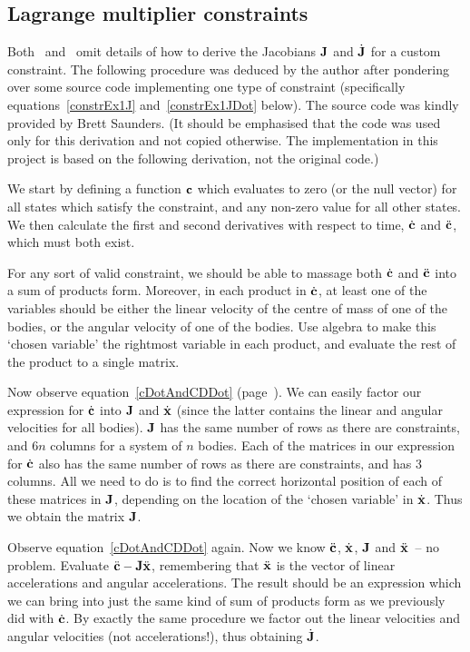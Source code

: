 \subsection{Lagrange multiplier constraints}

Both~\cite{BaraffWitkin:97} and~\cite{Saunders:PhD} omit details of how to derive the Jacobians
$\m{J}$ and $\dot{\m{J}}$ for a custom constraint. The following procedure was deduced
by the author after pondering over some source code implementing one type of constraint
(specifically equations~\ref{constrEx1J} and~\ref{constrEx1JDot} below). The source code
was kindly provided by Brett Saunders. (It should be emphasised that the code was used only
for this derivation and not copied otherwise. The implementation in this project is based
on the following derivation, not the original code.)

We start by defining a function $\ve{c}$ which evaluates to zero (or the null vector) for
all states which satisfy the constraint, and any non-zero value for all other states. 
We then calculate the first and second derivatives with respect to time, $\dot{\ve{c}}$
and $\ddot{\ve{c}}$, which must both exist.

For any sort of valid constraint, we should be able to massage both $\dot{\ve{c}}$ and
$\ddot{\ve{c}}$ into a sum of products form. Moreover, in each product in
$\dot{\ve{c}}$, at least one of the variables should be either the linear velocity of
the centre of mass of one of the bodies, or the angular velocity of one of the bodies.
Use algebra to make this `chosen variable' the rightmost variable in each product, and
evaluate the rest of the product to a single matrix.

Now observe equation~\ref{cDotAndCDDot} (page~\pageref{cDotAndCDDot}). We can easily
factor our expression for
$\dot{\ve{c}}$ into $\m{J}$ and $\dot{\ve{x}}$ (since the latter contains
the linear and angular velocities for all bodies). $\m{J}$ has the same number of rows
as there are constraints, and $6n$ columns for a system of $n$ bodies. Each of the matrices
in our expression for $\dot{\ve{c}}$ also has the same number of rows as there are
constraints, and has 3 columns. All we need to do is to find the correct horizontal position
of each of these matrices in $\m{J}$, depending on the location of the `chosen variable'
in $\dot{\ve{x}}$. Thus we obtain the matrix $\m{J}$.

Observe equation~\ref{cDotAndCDDot} again. Now we know $\ddot{\ve{c}}$, $\dot{\ve{x}}$,
$\m{J}$ and $\ddot{\ve{x}}$~-- no problem. Evaluate
$\ddot{\ve{c}} - \m{J}\ddot{\ve{x}}$, remembering that $\ddot{\ve{x}}$ is
the vector of linear accelerations and angular accelerations. The result should be an
expression which we can bring into just the same kind of sum of products form as we previously
did with $\dot{\ve{c}}$. By exactly the same procedure we factor out the linear velocities
and angular velocities (not accelerations!), thus obtaining $\dot{\m{J}}$.

